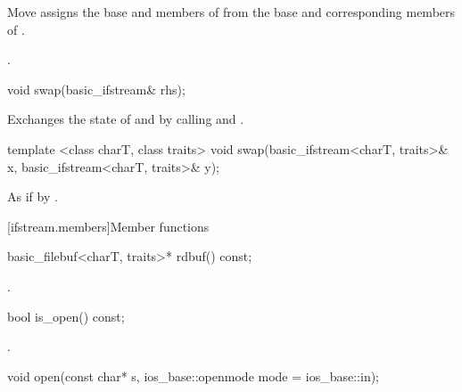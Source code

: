\begin{itemdescr}
\pnum
\effects Move assigns the base and members of  from the base and corresponding
members of .

\pnum
\returns {}.
\end{itemdescr}

%
%
\begin{itemdecl}
void swap(basic_ifstream& rhs);
\end{itemdecl}

\begin{itemdescr}
\pnum
\effects Exchanges the state of 
and  by calling
 and
.
\end{itemdescr}

%
%
\begin{itemdecl}
template <class charT, class traits>
  void swap(basic_ifstream<charT, traits>& x,
            basic_ifstream<charT, traits>& y);
\end{itemdecl}

\begin{itemdescr}
\pnum
\effects As if by .
\end{itemdescr}

[ifstream.members]{Member functions}

%
\begin{itemdecl}
basic_filebuf<charT, traits>* rdbuf() const;
\end{itemdecl}

\begin{itemdescr}
\pnum
\returns
{}.
\end{itemdescr}

%
\begin{itemdecl}
bool is_open() const;
\end{itemdecl}

\begin{itemdescr}
\pnum
\returns
{}.
\end{itemdescr}

%
\begin{itemdecl}
void open(const char* s, ios_base::openmode mode = ios_base::in);
\end{itemdecl}

